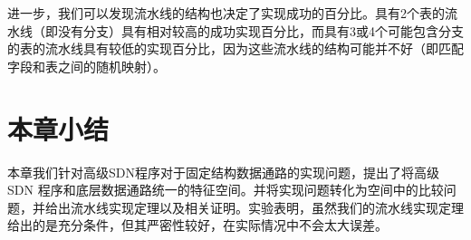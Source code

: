 \documentclass{ctexart}
\begin{document}

进一步，我们可以发现流水线的结构也决定了实现成功的百分比。具有2个表的流水线（即没有分支）具有相对较高的成功实现百分比，而具有3或4个可能包含分支的表的流水线具有较低的实现百分比，因为这些流水线的结构可能并不好（即匹配字段和表之间的随机映射）。



\section{本章小结}

本章我们针对高级SDN程序对于固定结构数据通路的实现问题，提出了将高级 SDN 程序和底层数据通路统一的特征空间。并将实现问题转化为空间中的比较问题，并给出流水线实现定理以及相关证明。实验表明，虽然我们的流水线实现定理给出的是充分条件，但其严密性较好，在实际情况中不会太大误差。
\end{document}
